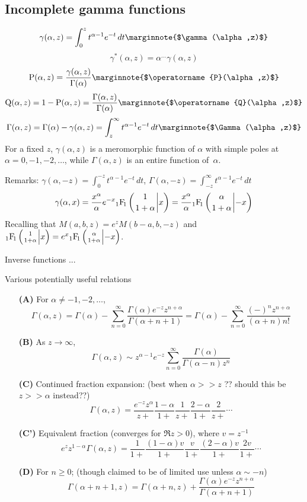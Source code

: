 \documentclass[10pt,dvipdfmx,letterpaper,twoside]{article}
\let\O=\operatorname
\newcommand{\Hyper}[5]{{\mathop{{}_{#1}\!\O{F\!}_{#2}\left({\genfrac{}{}{0pt}{}{#3}{#4}}\middle|{#5}\right)}}}
\newenvironment{implementation}{\noindent\begin{framed}}{\end{framed}}
\let\DEF=\marginnote
\let\al=\alpha
\let\gam=\gamma
\let\Gam=\Gamma
\begin{document}
\subsection{Incomplete gamma functions}

\[ \gam(\al,z) = \int_0^z t^{\al-1}e^{-t}\,dt   \DEF{$\gam(\al,z)$}\]
\[ \gam^*(\al,z) = \al^{\dots}\gam(\al,z) \]
\[ \O{P}(\al,z) = \frac{\gam(\al,z)}{\Gam(\al)}   \DEF{$\O{P}(\al,z)$}\]
\[ \O{Q}(\al,z) = 1 - \O{P}(\al,z) = \frac{\Gam(\al,z)}{\Gam(\al)}    \DEF{$\O{Q}(\al,z)$}\]
\[ \Gam(\al,z) = \Gam(\al) - \gam(\al,z) = \int_z^\infty t^{\al-1}e^{-t}\,dt \DEF{$\Gam(\al,z)$}\]
For a fixed $z$, $\gamma(\al,z)$ is a meromorphic function of $\al$ with simple poles at $\al=0,-1,-2,\dots$,
while $\Gam(\al,z)$ is an entire function of~$\al$.

Remarks: $\gam(\al,-z)=\int_0^{-z}t^{\al-1}e^{-t}\,dt$, $\Gam(\al,-z)=\int_{-z}^\infty t^{\al-1}e^{-t}\,dt$
\[ \gam(\al,x) = \frac{x^\al}{\al} e^{-x} \Hyper{1}{1}{1}{1+\al}{x} = \frac{x^\al}{\al}\Hyper{1}{1}{\al}{1+\al}{-x} \]
Recalling that $M(a,b,z)=e^{z} M(b-a,b,-z)$ and $\Hyper{1}{1}{1}{1+\al}{x}=e^{x}\Hyper{1}{1}{\al}{1+\al}{-x}$.

Inverse functions ...

\begin{implementation}
Various potentially useful relations
\begin{itemize}
\item[\bf(A)] For $\al\neq-1,-2,\dots$,
\[ \Gam(\al,z) = \Gam(\al) - \sum_{n=0}^\infty\frac{\Gam(\al)e^{-z}z^{n+\al}}{\Gam(\al+n+1)} = \Gam(\al) - \sum_{n=0}^\infty\frac{(-)^nz^{n+\al}}{(\al+n)n!} \]
\item[\bf(B)] As $z\to\infty$,
\[ \Gam(\al,z)\sim z^{\al-1}e^{-z}\sum_{n=0}^\infty\frac{\Gam(\al)}{\Gam(\al-n)z^n} \]
\item[\bf(C)] Continued fraction expansion: (best when $\al>>z$ ?? should this be $z>>\al$ instead??)
\[ \Gam(\al,z) = \frac{e^{-z}z^\al}{z+} \frac{1-\al}{1+} \frac{1}{z+} \frac{2-\al}{1+} \frac{2}{z+} \cdots \]
\item[\bf(C')] Equivalent fraction (converges for $\Re z>0$), where $v=z^{-1}$
\[ e^{z}z^{1-\al}\Gam(\al,z) = \frac{1}{1+} \frac{(1-\al)v}{1+} \frac{v}{1+} \frac{(2-\al)v}{1+} \frac{2v}{1+} \cdots \]
\item[\bf(D)] For $n\geq0$; (though claimed to be of limited use unless $\al\sim-n$)
\[ \Gam(\al+n+1, z) = \Gam(\al+n, z) + \frac{\Gam(\al)e^{-z}z^{n+\al}}{\Gam(\al+n+1)} \]
\end{itemize}
\end{implementation}
\end{document}
